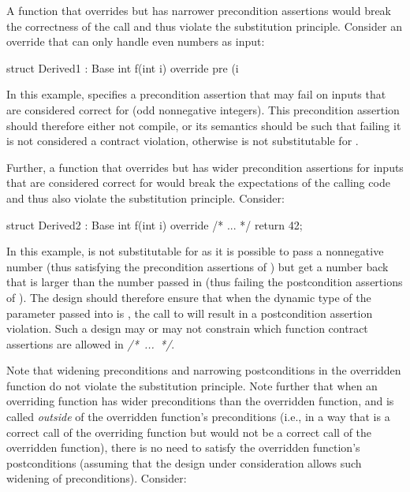 A function that overrides  but has narrower precondition assertions would break the correctness of the call and thus violate the substitution principle. Consider an override that can only handle even numbers as input:
\begin{codeblock}
struct Derived1 : Base {
  int f(int i) override
    pre (i %
}
\end{codeblock}
In this example,  specifies a precondition assertion that may fail on inputs that are considered correct for  (odd nonnegative integers). This precondition assertion should therefore either not compile, or its semantics should be such that failing it is not considered a contract violation, otherwise  is not substitutable for .

Further, a function that overrides  but has wider precondition assertions for inputs that are considered correct for  would break the expectations of the calling code and thus also violate the substitution principle. Consider:

\begin{codeblock}
struct Derived2 : Base {
  int f(int i) override /* ... */ {
    return 42;
  }
}
\end{codeblock}

In this example,  is not substitutable for  as it is possible to pass a nonnegative number (thus satisfying the precondition assertions of ) but get a number back that is larger than the number passed in (thus failing the postcondition assertions of ). The design should therefore ensure that when the dynamic type of the parameter passed into   is , the call to  will result in a postcondition assertion violation. Such a design may or may not constrain which function contract assertions are allowed in \mbox{\emph{/* ... */}}.

Note that widening preconditions and narrowing postconditions in the overridden function do not violate the substitution principle. Note further that when an overriding function has wider preconditions than the overridden function, and is called \emph{outside} of the overridden function's preconditions (i.e., in a way that is a correct call of the overriding function but would not be a correct call of the overridden function), there is no need to satisfy the overridden function's postconditions (assuming that the design under consideration allows such widening of preconditions). Consider:

